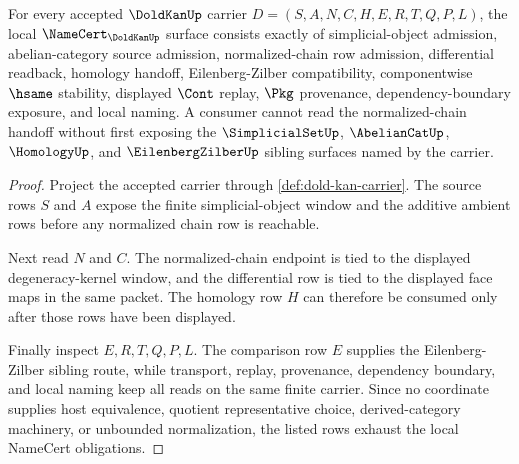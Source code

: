 \begin{theorem}
\label{thm:dold-kan-namecert-obligations}
For every accepted $\DoldKanUp$ carrier $D=(S,A,N,C,H,E,R,T,Q,P,L)$, the local $\NameCert_{\DoldKanUp}$ surface consists exactly of simplicial-object admission, abelian-category source admission, normalized-chain row admission, differential readback, homology handoff, Eilenberg-Zilber compatibility, componentwise $\hsame$ stability, displayed $\Cont$ replay, $\Pkg$ provenance, dependency-boundary exposure, and local naming. A consumer cannot read the normalized-chain handoff without first exposing the $\SimplicialSetUp$, $\AbelianCatUp$, $\HomologyUp$, and $\EilenbergZilberUp$ sibling surfaces named by the carrier.
\end{theorem}
\begin{proof}
Project the accepted carrier through \autoref{def:dold-kan-carrier}. The source rows $S$ and $A$ expose the finite simplicial-object window and the additive ambient rows before any normalized chain row is reachable.

Next read $N$ and $C$. The normalized-chain endpoint is tied to the displayed degeneracy-kernel window, and the differential row is tied to the displayed face maps in the same packet. The homology row $H$ can therefore be consumed only after those rows have been displayed.

Finally inspect $E,R,T,Q,P,L$. The comparison row $E$ supplies the Eilenberg-Zilber sibling route, while transport, replay, provenance, dependency boundary, and local naming keep all reads on the same finite carrier. Since no coordinate supplies host equivalence, quotient representative choice, derived-category machinery, or unbounded normalization, the listed rows exhaust the local NameCert obligations.
\end{proof}

